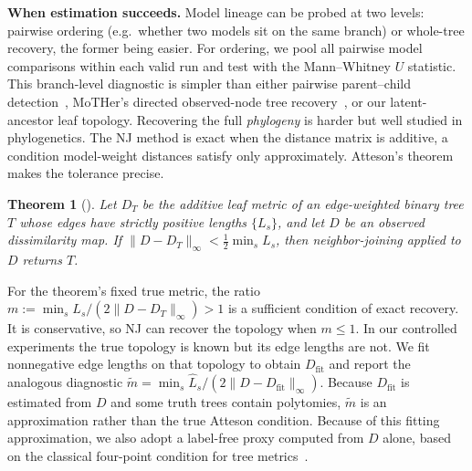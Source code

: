 \documentclass{article}
\newtheorem{theorem}{Theorem}
\theoremstyle{definition}
\theoremstyle{plain}
\begin{document}
\textbf{When estimation succeeds.}\label{sec:framework:theory}
Model lineage can be probed at two levels: pairwise ordering (e.g.\ whether two models sit on the same
branch) or whole-tree recovery, the former being easier. For ordering, we pool all pairwise model
comparisons within each valid run and test with the Mann--Whitney $U$ statistic. This branch-level
diagnostic is simpler than either pairwise parent--child detection~\citep{yu2025neural}, MoTHer's
directed observed-node tree recovery~\citep{horwitz2025mother}, or our latent-ancestor leaf topology. Recovering the full
\textit{phylogeny} is harder but well studied in phylogenetics. The NJ method is exact when the distance matrix is
additive, a condition model-weight distances satisfy only approximately. Atteson's theorem makes the
tolerance precise.
\begin{theorem}[\citealp{atteson1999performance}]\label{thm:atteson}
Let $D_T$ be the additive leaf metric of an edge-weighted binary tree $T$ whose edges have strictly
positive lengths $\{L_s\}$, and let $D$ be an observed dissimilarity map. If
$\lVert D-D_T\rVert_\infty < \tfrac12\min_s L_s$, then neighbor-joining applied to $D$ returns $T$.
\end{theorem}
For the theorem's fixed true metric, the ratio
$m:=\min_s L_s/(2\lVert D-D_T\rVert_\infty)>1$ is a sufficient condition of exact recovery. It is
conservative, so NJ can recover the topology when $m\leq1$. In our controlled experiments the true topology is
known but its edge lengths are not. We fit nonnegative edge lengths on that topology to obtain
$D_{\mathrm{fit}}$ and report the analogous diagnostic
$\widetilde m=\min_s\widehat L_s/(2\lVert D-D_{\mathrm{fit}}\rVert_\infty)$. Because
$D_{\mathrm{fit}}$ is estimated from $D$ and some truth trees contain polytomies, $\widetilde m$ is an approximation rather than the true Atteson condition.  Because of this fitting approximation, we also
adopt a label-free proxy computed from $D$ alone, based on the classical four-point condition for tree
metrics~\citep{sempleSteel2003phylogenetics}.
\end{document}
